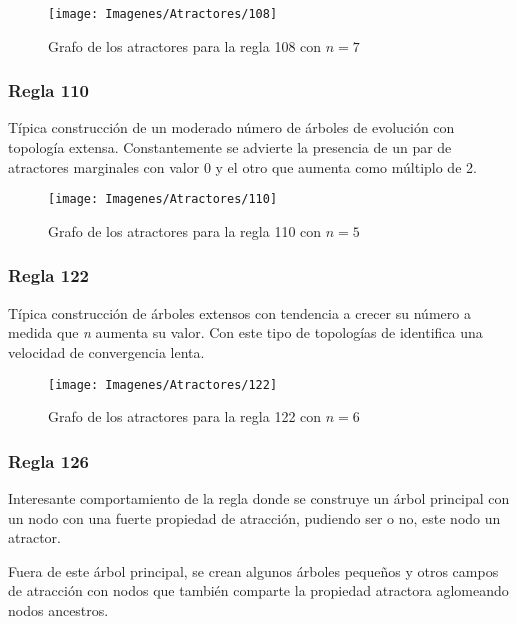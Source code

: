 \documentclass[]{article}
\begin{document}
				\hfill\break
				\hfill\break
				\begin{figure}[!h]
					\centering
					\texttt{[image: Imagenes/Atractores/108]}
					\caption{Grafo de los atractores para la regla 108 con $n=7$}
					\label{Regla_108}
				\end{figure}
			
			\newpage
			\subsubsection{Regla 110}
				\justifying
				Típica construcción de un moderado número de árboles de evolución con topología extensa. Constantemente se advierte la presencia de un par de atractores marginales con valor 0 y el otro que aumenta como múltiplo de 2.
				
				\hfill\break
				\hfill\break
				\begin{figure}[!h]
					\centering
					\texttt{[image: Imagenes/Atractores/110]}
					\caption{Grafo de los atractores para la regla 110 con $n=5$}
					\label{Regla_110}
				\end{figure}
			
			\newpage
			\subsubsection{Regla 122}
				\justifying
				Típica construcción de árboles extensos con tendencia a crecer su número a medida que \textit{n} aumenta su valor. Con este tipo de topologías de identifica una velocidad de convergencia lenta.
				
				\hfill\break
				\hfill\break
				\begin{figure}[!h]
					\centering
					\texttt{[image: Imagenes/Atractores/122]}
					\caption{Grafo de los atractores para la regla 122 con $n=6$}
					\label{Regla_122}
				\end{figure}
			
			\newpage
			\subsubsection{Regla 126}
				\justifying
				Interesante comportamiento de la regla donde se construye un árbol principal con un nodo con una fuerte propiedad de atracción, pudiendo ser o no, este nodo un atractor.
				
				\hfill\break
				\justifying
				Fuera de este árbol principal, se crean algunos árboles pequeños y otros campos de atracción con nodos que también comparte la propiedad atractora aglomeando nodos ancestros.
				
\end{document}
